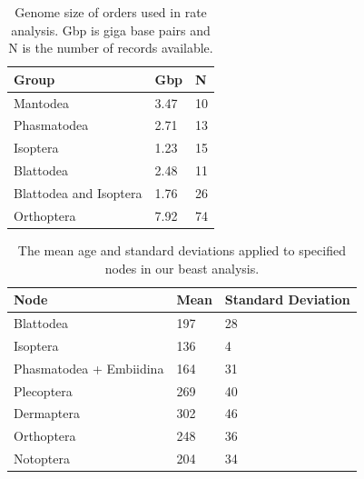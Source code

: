 \begin{table}
\centering
\begin{tabular}{lll}
\hline
Group & Gbp & N \\ \hline
Mantodea & 3.47 & 10 \\
Phasmatodea & 2.71 & 13 \\
Isoptera & 1.23 & 15 \\
Blattodea & 2.48 & 11 \\
Blattodea and Isoptera & 1.76 & 26 \\
Orthoptera & 7.92 & 74\\ \hline
\end{tabular}
\caption{Genome size of orders used in rate analysis. Gbp is giga base pairs and N is the number of records available.}
\label{tab:genomesizes}
\end{table}

\begin{table}
\centering
\begin{tabular}{lll}
\hline
Node & Mean & Standard Deviation\\ \hline
Blattodea & 197& 28 \\
Isoptera & 136& 4\\
Phasmatodea + Embiidina& 164 & 31\\
Plecoptera & 269 & 40\\
Dermaptera & 302 & 46\\
Orthoptera & 248 & 36\\
Notoptera & 204 & 34\\ \hline
\end{tabular}
\caption{The mean age and standard deviations applied to specified nodes in our beast analysis.}
\label{tab:nodeconstraints}
\end{table}